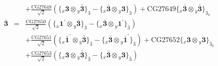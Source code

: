 \documentclass[english]{article}
\newcommand{\rep}[1]{\mathbf{#1}}
\newcommand{\repx}[2]{{}_{#2}\mathbf{#1}}
\newcommand{\subcg}[3]{\big\{ \repx{#1}{x}\otimes\repx{#2}{y}\big\}^{}_{#3}}
\begin{document}
\begin{itemize}
\begin{eqnarray*}
 & & +\frac{\text{CG27648}}{\sqrt{2}}\left(\subcg{3}{\bar{3}}{3}-\subcg{\bar{3}}{3}{3}\right)+\text{CG27649}\subcg{\bar{3}}{\bar{3}}{3_{a}}
\\
\rep{\bar{3}} &=& \frac{\text{CG27650}}{\sqrt{2}}\left(\subcg{1^{\prime}}{\bar{3}}{\bar{3}}-\subcg{\bar{3}}{1^{\prime}}{\bar{3}}\right) \\ 
 & & +\frac{\text{CG27651}}{\sqrt{2}}\left(\subcg{\bar{1}^{\prime}}{\bar{3}}{\bar{3}}-\subcg{\bar{3}}{\bar{1}^{\prime}}{\bar{3}}\right)+\text{CG27652}\subcg{3}{3}{\bar{3}_{a}} \\ 
 & & +\frac{\text{CG27653}}{\sqrt{2}}\left(\subcg{3}{\bar{3}}{\bar{3}}-\subcg{\bar{3}}{3}{\bar{3}}\right)
\end{eqnarray*}
\end{itemize}
\end{document}
